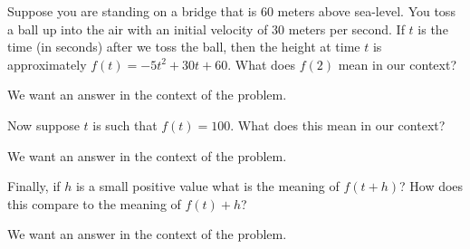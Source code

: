 

\begin{question} 
Suppose you are standing on a bridge that is 60 meters above
sea-level. You toss a ball up into the air with an initial velocity of
30 meters per second.  If $t$ is the time (in seconds) after we toss
the ball, then the height at time $t$ is approximately $f(t) = -5 t^2
+30t+60$. What does $f(2)$ mean in our context?
\begin{solution}
\begin{hint}
We want an answer in the context of the problem. 
\end{hint}
\end{solution}
Now suppose $t$ is such that $f(t) = 100$. What does this mean in our
context?
\begin{solution}
\begin{hint}
We want an answer in the context of the problem. 
\end{hint}
\end{solution}
Finally, if $h$ is a small positive value what is the meaning of
$f(t+h)$? How does this compare to the meaning of $f(t)+h$?
\begin{solution}
\begin{hint}
We want an answer in the context of the problem. 
\end{hint}
\end{solution}
\end{question}


